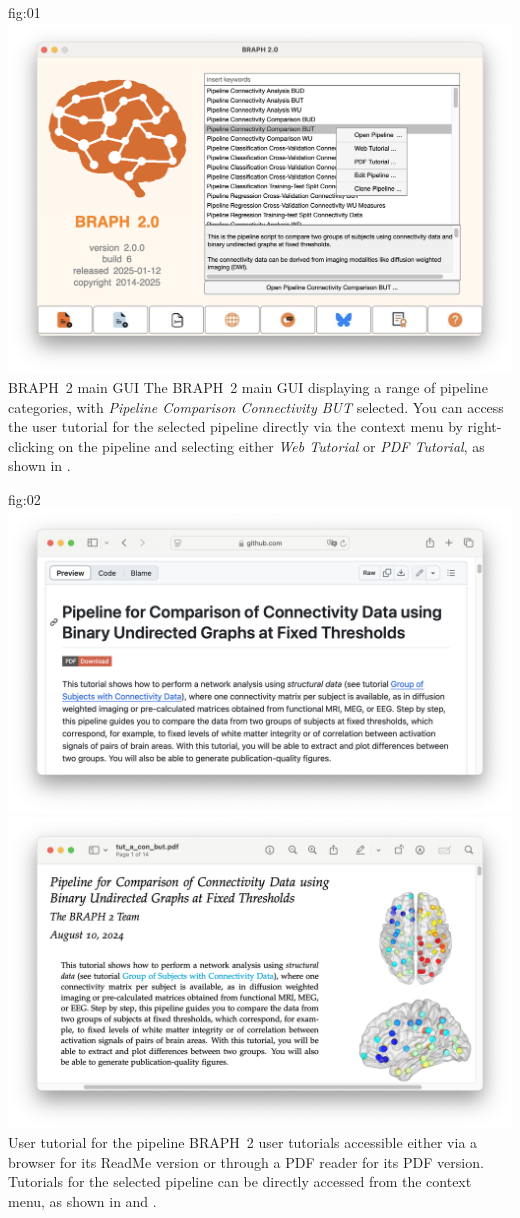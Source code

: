 \documentclass[justified]{tufte-handout}
\begin{document}
{fig:01}
{
	\includegraphics{fig01.png}
}
{BRAPH~2 main GUI}
{
	The BRAPH~2 main GUI displaying a range of pipeline categories, with \textit{Pipeline Comparison Connectivity BUT} selected. You can access the user tutorial for the selected pipeline directly via the context menu by right-clicking on the pipeline and selecting either \textit{Web Tutorial} or \textit{PDF Tutorial}, as shown in .
}

{fig:02}
{
	\includegraphics{fig02a.png}
	\includegraphics{fig02b.png}
}
{User tutorial for the pipeline}
{
	BRAPH~2 user tutorials accessible either via a browser for its ReadMe version or through a PDF reader for its PDF version. Tutorials for the selected pipeline can be directly accessed from the context menu, as shown in  and .
}
\end{document}
